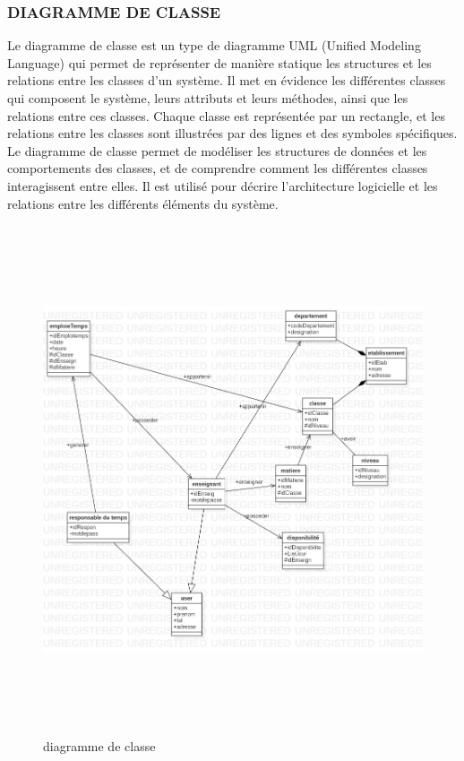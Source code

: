 \documentclass[english,12pt,a4paper]{report}
\begin{document}
\subsubsection{DIAGRAMME DE CLASSE}
Le diagramme de classe est un type de diagramme UML (Unified Modeling Language) qui permet de représenter de manière statique les structures et les relations entre les classes d'un système. Il met en évidence les différentes classes qui composent le système, leurs attributs et leurs méthodes, ainsi que les relations entre ces classes. Chaque classe est représentée par un rectangle, et les relations entre les classes sont illustrées par des lignes et des symboles spécifiques. Le diagramme de classe permet de modéliser les structures de données et les comportements des classes, et de comprendre comment les différentes classes interagissent entre elles. Il est utilisé pour décrire l'architecture logicielle et les relations entre les différents éléments du système.
\begin{figure}[h]
	\centering
	\includegraphics*[height=15cm, width=18cm]{newdiagrammeclasse.jpg}
	\caption{diagramme de classe}
	\label{fig10: diagramme de classe}
\end{figure}
\end{document}
